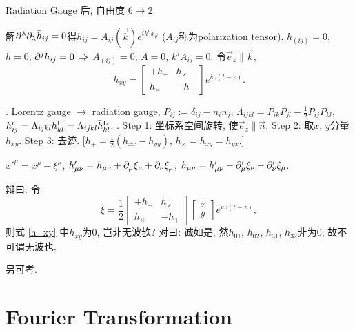 Radiation Gauge 后, 自由度 $6\to2$.

解$\partial^{\lambda}\partial_{\lambda}\bar{h}_{ij}=0$得$h_{ij}=A_{ij}(\vec{k})e^{ik^\mu x_\mu}$ ($A_{ij}$称为polarization tensor). $h_{(ij)}=0$, $h=0$, $\partial^{j}h_{ij}=0$ $\Rightarrow$ $A_{(ij)}=0$, $A=0$, $k^{j}A_{ij}=0$. 令$\vec{e}_z\parallel\vec{k}$,
\begin{equation}
    h_{xy}=\begin{bmatrix}
        +h_+&h_\times\\
        h_\times&-h_+
    \end{bmatrix}e^{i\omega(t-z)}.\label{h_xy}
\end{equation}

\cite{Maggiore2014}. Lorentz gauge $\to$ radiation gauge, $P_{ij}:=\delta_{ij}-n_in_j$, $\Lambda_{ijkl}=P_{ik}P_{jl}-\frac{1}{2}P_{ij}P_{kl}$, $h_{ij}^\text{r}=\Lambda_{ijkl}h_{kl}^\text{L}=\Lambda_{ijkl}\bar{h}_{kl}^\text{L}$. \cite{Sathyaprakash2009}. Step 1: 坐标系空间旋转, 使$\vec{e}_z\parallel\vec{n}$. Step 2: 取$x$, $y$分量$h_{xy}$. Step 3: 去迹. [$h_+=\frac{1}{2}(h_{xx}-h_{yy})$, $h_\times=h_{xy}=h_{yx}$.]

$x'^\mu=x^\mu-\xi^\mu$, $h'_{\mu\nu}=h_{\mu\nu}+\partial_\mu\xi_\nu+\partial_\nu\xi_\mu$, $h_{\mu\nu}=h'_{\mu\nu}-\partial'_\mu\xi_\nu-\partial'_\nu\xi_\mu$.

辩曰: 令
\begin{equation}
    \xi=\frac{1}{2}\begin{bmatrix}
        +h_+&h_\times\\
        h_\times&-h_+
   \end{bmatrix}\begin{bmatrix}
    x\\y
    \end{bmatrix}e^{i\omega(t-z)},
\end{equation}
则式 \eqref{h_xy} 中$h_{xy}$为$0$, 岂非无波欤? 对曰: 诚如是, 然$h_{01}$, $h_{02}$, $h_{31}$, $h_{32}$非为$0$, 故不可谓无波也.

另可考\cite{Jaranowski2009}.

\section{Fourier Transformation}

